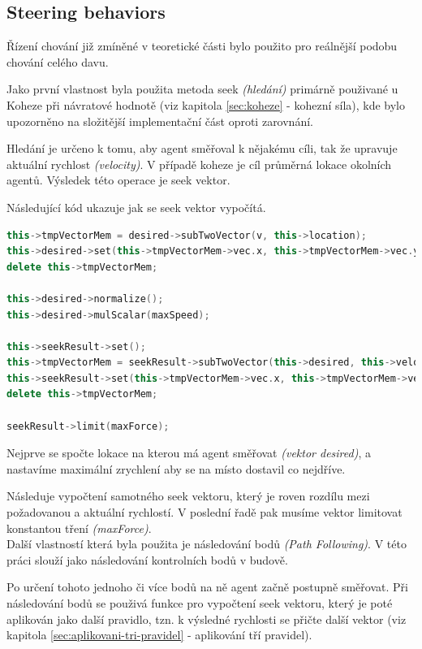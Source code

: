 \documentclass[czech,public,dept460,male,cpdeclaration]{diploma}
\begin{document}
\subsection{Steering behaviors}\label{sec:steering-behaviors}
Řízení chování \cite{linkToSteeringBehaviors} již zmíněné v teoretické části bylo použito pro reálnější podobu chování celého davu.

Jako první vlastnost byla použita metoda seek \textit{(hledání)} primárně použivané u Koheze při návratové hodnotě (viz kapitola \ref{sec:koheze} - kohezní síla), kde bylo upozorněno na složitější implementační část oproti zarovnání.

Hledání je určeno k tomu, aby agent směřoval k nějakému cíli, tak že upravuje aktuální rychlost \textit{(velocity)}. V případě koheze je cíl průměrná lokace okolních agentů. Výsledek této operace je seek vektor.

Následující kód ukazuje jak se seek vektor vypočítá.

\begin{lstlisting}[language=c++,label=src:seek,caption=Vypočtení seek vektoru]
this->tmpVectorMem = desired->subTwoVector(v, this->location);
this->desired->set(this->tmpVectorMem->vec.x, this->tmpVectorMem->vec.y, this->tmpVectorMem->vec.z);
delete this->tmpVectorMem;

this->desired->normalize();
this->desired->mulScalar(maxSpeed);

this->seekResult->set();
this->tmpVectorMem = seekResult->subTwoVector(this->desired, this->velocity);
this->seekResult->set(this->tmpVectorMem->vec.x, this->tmpVectorMem->vec.y, this->tmpVectorMem->vec.z);
delete this->tmpVectorMem;

seekResult->limit(maxForce);
\end{lstlisting}

Nejprve se spočte lokace na kterou má agent směřovat \textit{(vektor desired)}, a nastavíme maximální zrychlení aby se na místo dostavil co nejdříve.

Následuje vypočtení samotného seek vektoru, který je roven rozdílu mezi požadovanou a aktuální rychlostí. V poslední řadě pak musíme vektor limitovat konstantou tření \textit{(maxForce)}.
\\

Další vlastností která byla použita je následování bodů \textit{(Path Following)}. V této práci slouží jako následování kontrolních bodů v budově.

Po určení tohoto jednoho či více bodů na ně agent začně postupně směřovat. Při následování bodů se použivá funkce pro vypočtení seek vektoru, který je poté aplikován jako další pravidlo, tzn. k výsledné rychlosti se přičte další vektor (viz kapitola \ref{sec:aplikovani-tri-pravidel} - aplikování tří pravidel).
\end{document}

